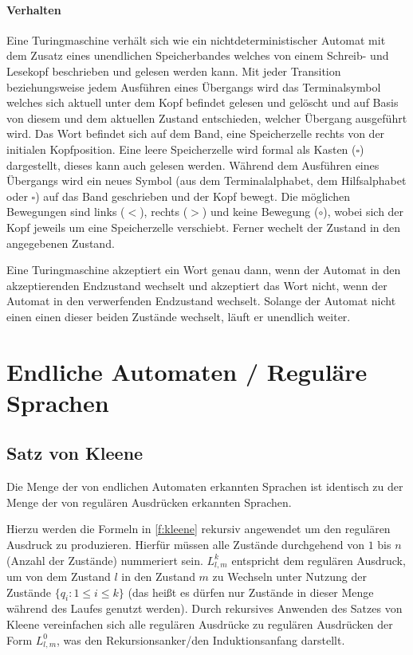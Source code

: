         \paragraph{Verhalten}
            Eine Turingmaschine verhält sich wie ein nichtdeterministischer Automat mit dem Zusatz eines unendlichen Speicherbandes welches von einem Schreib- und Lesekopf beschrieben und gelesen werden kann. Mit jeder Transition beziehungsweise jedem Ausführen eines Übergangs wird das Terminalsymbol welches sich aktuell unter dem Kopf befindet gelesen und gelöscht und auf Basis von diesem und dem aktuellen Zustand entschieden, welcher Übergang ausgeführt wird. Das Wort befindet sich auf dem Band, eine Speicherzelle rechts von der initialen Kopfposition. Eine leere Speicherzelle wird formal als Kasten ($ \square $) dargestellt, dieses kann auch gelesen werden. Während dem Ausführen eines Übergangs wird ein neues Symbol (aus dem Terminalalphabet, dem Hilfsalphabet oder $ \square $) auf das Band geschrieben und der Kopf bewegt. Die möglichen Bewegungen sind links ($ < $), rechts ($ > $) und keine Bewegung ($ \circ $), wobei sich der Kopf jeweils um eine Speicherzelle verschiebt. Ferner wechelt der Zustand in den angegebenen Zustand.

            Eine Turingmaschine akzeptiert ein Wort genau dann, wenn der Automat in den akzeptierenden Endzustand wechselt und akzeptiert das Wort nicht, wenn der Automat in den verwerfenden Endzustand wechselt. Solange der Automat nicht einen einen dieser beiden Zustände wechselt, läuft er unendlich weiter.


\section{Endliche Automaten / Reguläre Sprachen}
    \subsection{Satz von Kleene}
        Die Menge der von endlichen Automaten erkannten Sprachen ist identisch zu der Menge der von regulären Ausdrücken erkannten Sprachen.

        Hierzu werden die Formeln in \ref{f:kleene} rekursiv angewendet um den regulären Ausdruck zu produzieren. Hierfür müssen alle Zustände durchgehend von $ 1 $ bis $ n $ (Anzahl der Zustände) nummeriert sein. $ L ^ k _ { l, m } $ entspricht dem regulären Ausdruck, um von dem Zustand $ l $ in den Zustand $ m $ zu Wechseln unter Nutzung der Zustände $ \{ q _ i : 1 \leq i \leq k \} $ (das heißt es dürfen nur Zustände in dieser Menge während des Laufes genutzt werden). Durch rekursives Anwenden des Satzes von Kleene vereinfachen sich alle regulären Ausdrücke zu regulären Ausdrücken der Form $ L ^ 0 _ { l, m } $, was den Rekursionsanker/den Induktionsanfang darstellt.

